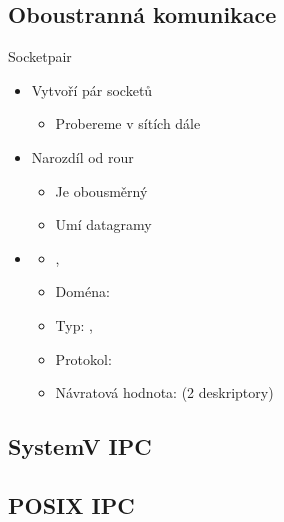\subsection*{Oboustranná komunikace}
\frame{\subsectionpage}



\begin{frame}{Socketpair}

  \begin{itemize}
    \item Vytvoří pár socketů
    \begin{itemize}
      \item Probereme v sítích dále
    \end{itemize}

    \pause

    \item Narozdíl od rour
    \begin{itemize}
      \item Je obousměrný
      \item Umí datagramy
    \end{itemize}

    \pause

    \item \small {}
    \begin{itemize}
      \item {}, 
      \item Doména: 
      \item Typ: , 
      \item Protokol: 
      \item Návratová hodnota:  (2 deskriptory)
    \end{itemize}
  \end{itemize}

\end{frame}

\subsection*{SystemV IPC}
\frame{\subsectionpage}



\subsection*{POSIX IPC}
\frame{\subsectionpage}

